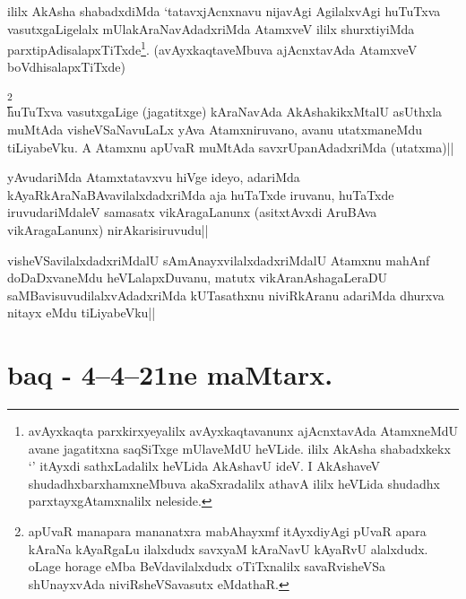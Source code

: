 
\begin{artha} 
ililx AkAsha shabadxdiMda `tatavxjAcnxnavu nijavAgi AgilalxvAgi 
huTuTxva vasutxgaLigelalx mUlakAraNavAdadxriMda AtamxveV ililx 
shurxtiyiMda parxtipAdisalapxTiTxde\footnote[1]{avAyxkaqta 
parxkirxyeyalilx avAyxkaqtavanunx ajAcnxtavAda AtamxneMdU avane 
jagatitxna saqSiTxge mUlaveMdU heVLide. ililx AkAsha shabadxkekx 
`\stext' itAyxdi sathxLadalilx heVLida AkAshavU ideV. I AkAshaveV 
shudadhxbarxhamxneMbuva akaSxradalilx athavA ililx heVLida shudadhx 
parxtayxgAtamxnalilx neleside.}. (avAyxkaqtaveMbuva 
ajAcnxtavAda AtamxveV boVdhisalapxTiTxde)
\end{artha}


\begin{artha} 
\footnote[2]{apUvaR manapara mananatxra mabAhayxmf itAyxdiyAgi pUvaR 
apara kAraNa kAyaRgaLu ilalxdudx savxyaM kAraNavU kAyaRvU alalxdudx. 
oLage horage eMba BeVdavilalxdudx oTiTxnalilx savaRvisheVSa 
shUnayxvAda niviRsheVSavasutx eMdathaR.}\\
huTuTxva vasutxgaLige (jagatitxge) kAraNavAda AkAshakikxMtalU asUthxla 
muMtAda visheVSaNavuLaLx yAva Atamxniruvano, avanu utatxmaneMdu 
tiLiyabeVku. A Atamxnu apUvaR muMtAda savxrUpanAdadxriMda (utatxma)||
\end{artha}


\begin{artha} 
yAvudariMda Atamxtatavxvu hiVge ideyo, adariMda 
kAyaRkAraNaBAvavilalxdadxriMda aja huTaTxde iruvanu, huTaTxde 
iruvudariMdaleV samasatx vikAragaLanunx (asitxtAvxdi AruBAva 
vikAragaLanunx) nirAkarisiruvudu||
\end{artha}

\begin{artha} 
visheVSavilalxdadxriMdalU sAmAnayxvilalxdadxriMdalU Atamxnu mahAnf 
doDaDxvaneMdu heVLalapxDuvanu, matutx vikAranAshagaLeraDU 
saMBavisuvudilalxvAdadxriMda kUTasathxnu niviRkAranu adariMda dhurxva 
nitayx eMdu tiLiyabeVku||
\end{artha}

\section*{baq - 4--4--21ne maMtarx. \stext}


